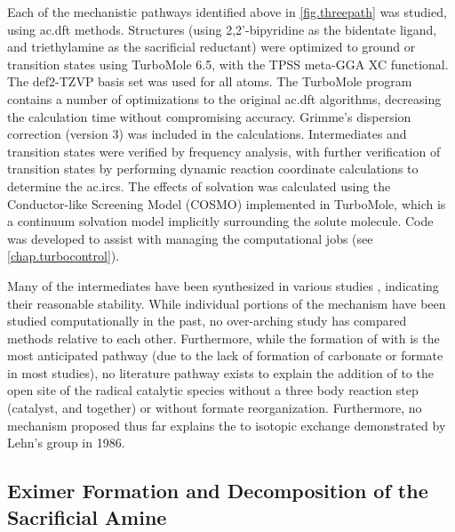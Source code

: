 Each of the mechanistic pathways identified above in \autoref{fig.threepath} was studied, using \gls{ac.dft} methods. Structures (using 2,2'-bipyridine as the bidentate ligand, and triethylamine as the sacrificial reductant) were optimized to ground or transition states using TurboMole 6.5\autocite{turbomole, ahlrichs1989}, with the TPSS meta-GGA XC functional\autocite{tao2003}. The def2-TZVP basis set was used for all atoms\autocite{schafer1994, weigend2005}. The TurboMole program contains a number of optimizations to the original \gls{ac.dft} algorithms\autocite{haase1993, treutler1995, eichkorn1997, eichkorn1995, sierka2003, deglmann2004, weigend2002, vonarnim1998, ahlrichs2004}, decreasing the calculation time without compromising accuracy. Grimme's dispersion correction (version 3) was included in the calculations\autocite{grimme2010}. Intermediates and transition states were verified by frequency analysis\autocite{deglmann2004, deglmann2002, grimme2002}, with further verification of transition states by performing dynamic reaction coordinate calculations to determine the \glspl{ac.irc}. The effects of solvation was calculated using the Conductor-like Screening Model (COSMO) implemented in TurboMole\autocite{klamt1993}, which is a continuum solvation model implicitly surrounding the solute molecule. Code was developed to assist with managing the computational jobs (see \autoref{chap.turbocontrol}).

Many of the intermediates have been synthesized in various studies , indicating their reasonable stability. While individual portions of the mechanism have been studied computationally in the past\autocite{agarwal2011, agarwal2012a, agarwal2012b}, no over-arching study has compared methods relative to each other. Furthermore, while the formation of  with  is the most anticipated pathway (due to the lack of formation of carbonate or formate in most studies), no literature pathway exists to explain the addition of  to the open site of the radical catalytic species without a three body reaction step (catalyst,  and  together) or without formate reorganization. Furthermore, no mechanism proposed thus far explains the  to  isotopic exchange demonstrated by Lehn's group in 1986\autocite{hawecker1986}. 

\subsection{Eximer Formation and Decomposition of the Sacrificial Amine}\label{ss.initiation}

